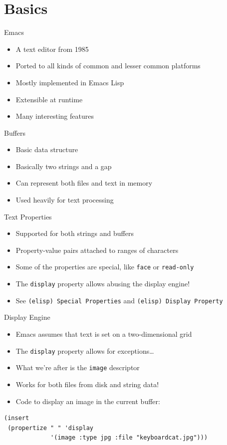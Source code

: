 \documentclass[presentation]{beamer}
\begin{document}
\section{Basics}
\label{sec-2}

\begin{frame}[label=sec-2-1]{Emacs}
\begin{itemize}
\item A text editor from 1985
\item Ported to all kinds of common and lesser common platforms
\item Mostly implemented in Emacs Lisp
\item Extensible at runtime
\item Many interesting features
\end{itemize}
\end{frame}

\begin{frame}[label=sec-2-2]{Buffers}
\begin{itemize}
\item Basic data structure
\item Basically two strings and a gap
\item Can represent both files and text in memory
\item Used heavily for text processing
\end{itemize}
\end{frame}

\begin{frame}[fragile,label=sec-2-3]{Text Properties}
 \begin{itemize}
\item Supported for both strings and buffers
\item Property-value pairs attached to ranges of characters
\item Some of the properties are special, like \texttt{face} or \texttt{read-only}
\item The \texttt{display} property allows abusing the display engine!
\item See \texttt{(elisp) Special Properties} and \texttt{(elisp) Display Property}
\end{itemize}
\end{frame}

\begin{frame}[fragile,label=sec-2-4]{Display Engine}
 \begin{itemize}
\item Emacs assumes that text is set on a two-dimensional grid
\item The \texttt{display} property allows for exceptions\ldots{}
\item What we're after is the \texttt{image} descriptor
\item Works for both files from disk and string data!
\item Code to display an image in the current buffer:
\end{itemize}

\begin{verbatim}
(insert
 (propertize " " 'display
             '(image :type jpg :file "keyboardcat.jpg")))
\end{verbatim}
\end{frame}
\end{document}
